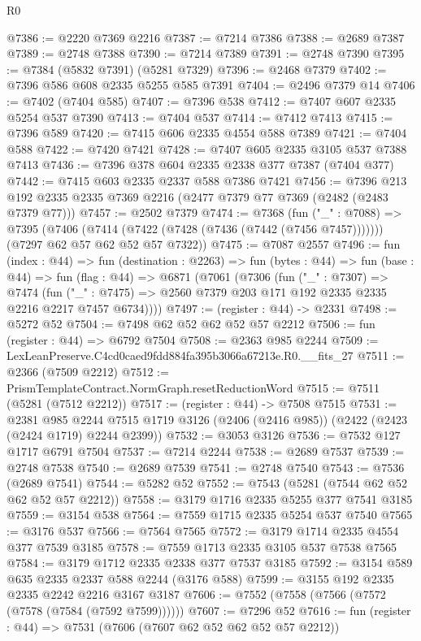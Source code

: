\begin{lexlean}{R0}
\begin{coremodule}
@7386 := @2220 @7369 @2216
@7387 := @7214 @7386
@7388 := @2689 @7387
@7389 := @2748 @7388
@7390 := @7214 @7389
@7391 := @2748 @7390
@7395 := @7384 (@5832 @7391) (@5281 @7329)
@7396 := @2468 @7379
@7402 := @7396 @586 @608 @2335 @5255 @585 @7391
@7404 := @2496 @7379 @14
@7406 := @7402 (@7404 @585)
@7407 := @7396 @538
@7412 := @7407 @607 @2335 @5254 @537 @7390
@7413 := @7404 @537
@7414 := @7412 @7413
@7415 := @7396 @589
@7420 := @7415 @606 @2335 @4554 @588 @7389
@7421 := @7404 @588
@7422 := @7420 @7421
@7428 := @7407 @605 @2335 @3105 @537 @7388 @7413
@7436 := @7396 @378 @604 @2335 @2338 @377 @7387 (@7404 @377)
@7442 := @7415 @603 @2335 @2337 @588 @7386 @7421
@7456 := @7396 @213 @192 @2335 @2335 @7369 @2216 (@2477 @7379 @77 @7369 (@2482 (@2483 @7379 @77)))
@7457 := @2502 @7379
@7474 := @7368
    (fun ("_" : @7088) =>
    @7395
      (@7406 (@7414 (@7422 (@7428 (@7436 (@7442 (@7456 @7457)))))))
      (@7297 @62 @57 @62 @52 @57 @7322))
@7475 := @7087 @2557
@7496 := fun (index : @44) =>
  fun (destination : @2263) =>
  fun (bytes : @44) =>
  fun (base : @44) =>
  fun (flag : @44) =>
  @6871
    (@7061
      (@7306
        (fun ("_" : @7307) =>
        @7474
          (fun ("_" : @7475) => @2560 @7379 @203 @171 @192 @2335 @2335 @2216 @2217 @7457 @6734))))
@7497 := (register : @44) -> @2331
@7498 := @5272 @52
@7504 := @7498 @62 @52 @62 @52 @57 @2212
@7506 := fun (register : @44) => @6792 @7504
@7508 := @2363 @985 @2244
@7509 := LexLeanPreserve.C4cd0caed9fdd884fa395b3066a67213e.R0.__fits_27
@7511 := @2366 (@7509 @2212)
@7512 := PrismTemplateContract.NormGraph.resetReductionWord
@7515 := @7511 (@5281 (@7512 @2212))
@7517 := (register : @44) -> @7508 @7515
@7531 := @2381
    @985
    @2244
    @7515
    @1719
    @3126
    (@2406 (@2416 @985))
    (@2422 (@2423 (@2424 @1719) @2244 @2399))
@7532 := @3053 @3126
@7536 := @7532 @127 @1717 @6791 @7504
@7537 := @7214 @2244
@7538 := @2689 @7537
@7539 := @2748 @7538
@7540 := @2689 @7539
@7541 := @2748 @7540
@7543 := @7536 (@2689 @7541)
@7544 := @5282 @52
@7552 := @7543 (@5281 (@7544 @62 @52 @62 @52 @57 @2212))
@7558 := @3179 @1716 @2335 @5255 @377 @7541 @3185
@7559 := @3154 @538
@7564 := @7559 @1715 @2335 @5254 @537 @7540
@7565 := @3176 @537
@7566 := @7564 @7565
@7572 := @3179 @1714 @2335 @4554 @377 @7539 @3185
@7578 := @7559 @1713 @2335 @3105 @537 @7538 @7565
@7584 := @3179 @1712 @2335 @2338 @377 @7537 @3185
@7592 := @3154 @589 @635 @2335 @2337 @588 @2244 (@3176 @588)
@7599 := @3155 @192 @2335 @2335 @2242 @2216 @3167 @3187
@7606 := @7552 (@7558 (@7566 (@7572 (@7578 (@7584 (@7592 @7599))))))
@7607 := @7296 @52
@7616 := fun (register : @44) => @7531 (@7606 (@7607 @62 @52 @62 @52 @57 @2212))

\end{coremodule}
\end{lexlean}
